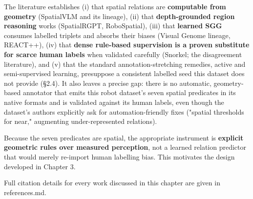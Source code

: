 The literature establishes (i) that spatial relations are \textbf{computable from geometry} (SpatialVLM and its lineage), (ii) that \textbf{depth-grounded region reasoning} works (SpatialRGPT, RoboSpatial), (iii) that \textbf{learned SGG} consumes labelled triplets and absorbs their biases (Visual Genome lineage, REACT++), (iv) that \textbf{dense rule-based supervision is a proven substitute for scarce human labels} when validated carefully (Snorkel; the disagreement literature), and (v) that the standard annotation-stretching remedies, active and semi-supervised learning, presuppose a consistent labelled seed this dataset does not provide (\S2.4). It also leaves a precise gap: there is no automatic, geometry-based annotator that emits this robot dataset's seven spatial predicates in its native formats and is validated against its human labels, even though the dataset's authors explicitly ask for automation-friendly fixes ("spatial thresholds for near," augmenting under-represented relations).

Because the seven predicates are spatial, the appropriate instrument is \textbf{explicit geometric rules over measured perception}, not a learned relation predictor that would merely re-import human labelling bias. This motivates the design developed in Chapter 3.

Full citation details for every work discussed in this chapter are given in references.md.